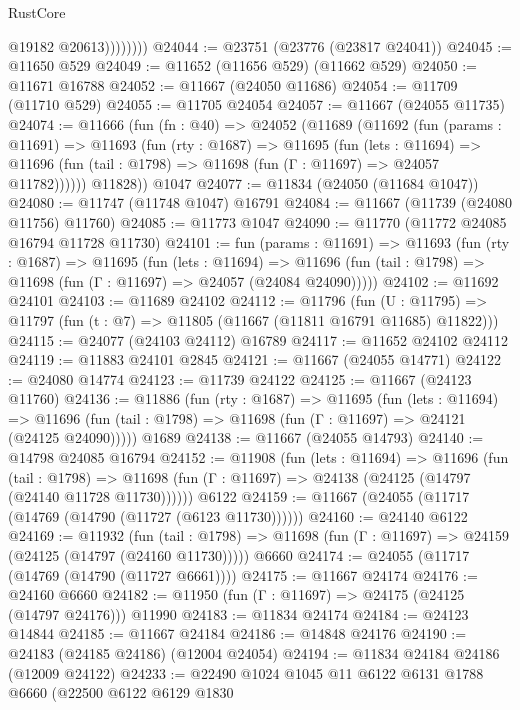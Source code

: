 \begin{lexlean}{RustCore}
\begin{coremodule}
                    @19182
                    @20613))))))))
@24044 := @23751 (@23776 (@23817 @24041))
@24045 := @11650 @529
@24049 := @11652 (@11656 @529) (@11662 @529)
@24050 := @11671 @16788
@24052 := @11667 (@24050 @11686)
@24054 := @11709 (@11710 @529)
@24055 := @11705 @24054
@24057 := @11667 (@24055 @11735)
@24074 := @11666
    (fun (fn : @40) =>
    @24052
      (@11689
        (@11692
          (fun (params : @11691) =>
          @11693
            (fun (rty : @1687) =>
            @11695
              (fun (lets : @11694) =>
              @11696 (fun (tail : @1798) => @11698 (fun (Γ : @11697) => @24057 @11782))))))
        @11828))
    @1047
@24077 := @11834 (@24050 (@11684 @1047))
@24080 := @11747 (@11748 @1047) @16791
@24084 := @11667 (@11739 (@24080 @11756) @11760)
@24085 := @11773 @1047
@24090 := @11770 (@11772 @24085 @16794 @11728 @11730)
@24101 := fun (params : @11691) =>
  @11693
    (fun (rty : @1687) =>
    @11695
      (fun (lets : @11694) =>
      @11696 (fun (tail : @1798) => @11698 (fun (Γ : @11697) => @24057 (@24084 @24090)))))
@24102 := @11692 @24101
@24103 := @11689 @24102
@24112 := @11796
    (fun (U : @11795) => @11797 (fun (t : @7) => @11805 (@11667 (@11811 @16791 @11685) @11822)))
@24115 := @24077 (@24103 @24112) @16789
@24117 := @11652 @24102 @24112
@24119 := @11883 @24101 @2845
@24121 := @11667 (@24055 @14771)
@24122 := @24080 @14774
@24123 := @11739 @24122
@24125 := @11667 (@24123 @11760)
@24136 := @11886
    (fun (rty : @1687) =>
    @11695
      (fun (lets : @11694) =>
      @11696 (fun (tail : @1798) => @11698 (fun (Γ : @11697) => @24121 (@24125 @24090)))))
    @1689
@24138 := @11667 (@24055 @14793)
@24140 := @14798 @24085 @16794
@24152 := @11908
    (fun (lets : @11694) =>
    @11696
      (fun (tail : @1798) =>
      @11698 (fun (Γ : @11697) => @24138 (@24125 (@14797 (@24140 @11728 @11730))))))
    @6122
@24159 := @11667 (@24055 (@11717 (@14769 (@14790 (@11727 (@6123 @11730))))))
@24160 := @24140 @6122
@24169 := @11932
    (fun (tail : @1798) => @11698 (fun (Γ : @11697) => @24159 (@24125 (@14797 (@24160 @11730)))))
    @6660
@24174 := @24055 (@11717 (@14769 (@14790 (@11727 @6661))))
@24175 := @11667 @24174
@24176 := @24160 @6660
@24182 := @11950 (fun (Γ : @11697) => @24175 (@24125 (@14797 @24176))) @11990
@24183 := @11834 @24174
@24184 := @24123 @14844
@24185 := @11667 @24184
@24186 := @14848 @24176
@24190 := @24183 (@24185 @24186) (@12004 @24054)
@24194 := @11834 @24184 @24186 (@12009 @24122)
@24233 := @22490
    @1024
    @1045
    @11
    @6122
    @6131
    @1788
    @6660
    (@22500
      @6122
      @6129
      @1830

\end{coremodule}
\end{lexlean}
